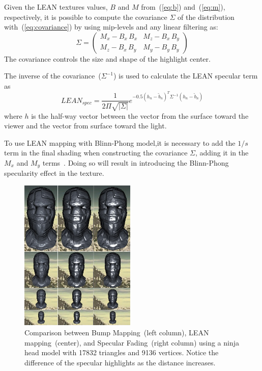 \documentclass[10pt, conference]{IEEEtran}
\begin{document}
Given the LEAN textures values, $B$ and $M$ from~(\ref{eq:b}) and~(\ref{eq:m}), respectively, it is possible to compute the covariance $\Sigma$ of the distribution with~(\ref{eq:covariance}) by using mip-levels and any linear filtering as:
\begin{equation}
	\label{eq:covariance}
	\Sigma = \begin{pmatrix}
    M_{x} - B_{x} \, B_{x} & M_{z} - B_{x} \, B_{y}\\
    M_{z} - B_{x} \, B_{y} & M_{y} - B_{y} \, B_{y}
  \end{pmatrix}
\end{equation}
The covariance controls the size and shape of the highlight center.

The inverse of the covariance~($\Sigma^{-1}$) is used to calculate the LEAN specular term as
\begin{equation}
	\label{eq:lean_spec}
	LEAN_{spec} = \dfrac{1}{2\Pi\sqrt{|\Sigma|}}e^{-0.5(h_{n} - \tilde{b}_{n})^{T} \Sigma^{-1}(h_{n} - \tilde{b}_{n})}
\end{equation}
where $h$ is the half-way vector between the vector from the surface toward the viewer and the vector from surface toward the light.

To use LEAN mapping with Blinn-Phong model,it is necessary to add the \mbox{$1 / s$} term in the final shading when constructing the covariance $\Sigma$, adding it in the $M_x$ and $M_y$ terms~\cite{Olano:2010:LM:1730804.1730834}. Doing so will result in introducing the Blinn-Phong specularity effect in the texture.

\begin{figure}[t]
	\includegraphics[width=0.49\textwidth]{figs/ninja.png}
	\caption{Comparison between Bump Mapping~(left column), LEAN mapping~(center), and Specular Fading~(right column) using a ninja head model with 17832 triangles and 9136 vertices. Notice the difference of the specular highlights as the distance increases.}
	\label{fig:ninja}
\end{figure}
\end{document}
